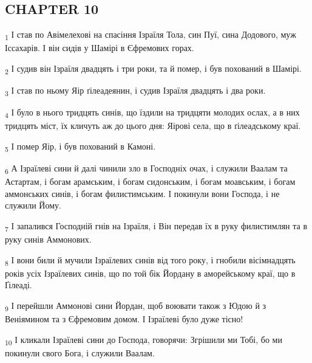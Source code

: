 \subsection{CHAPTER 10}
\begin{tcolorbox}
\textsubscript{1} І став по Авімелехові на спасіння Ізраїля Тола, син Пуї, сина Додового, муж Іссахарів. І він сидів у Шамірі в Єфремових горах.
\end{tcolorbox}
\begin{tcolorbox}
\textsubscript{2} І судив він Ізраїля двадцять і три роки, та й помер, і був похований в Шамірі.
\end{tcolorbox}
\begin{tcolorbox}
\textsubscript{3} І став по ньому Яір ґілеадеянин, і судив Ізраїля двадцять і два роки.
\end{tcolorbox}
\begin{tcolorbox}
\textsubscript{4} І було в нього тридцять синів, що їздили на тридцяти молодих ослах, а в них тридцять міст, їх кличуть аж до цього дня: Яірові села, що в ґілеадському краї.
\end{tcolorbox}
\begin{tcolorbox}
\textsubscript{5} І помер Яір, і був похований в Камоні.
\end{tcolorbox}
\begin{tcolorbox}
\textsubscript{6} А Ізраїлеві сини й далі чинили зло в Господніх очах, і служили Ваалам та Астартам, і богам арамським, і богам сидонським, і богам моавським, і богам аммонських синів, і богам филистимським. І покинули вони Господа, і не служили Йому.
\end{tcolorbox}
\begin{tcolorbox}
\textsubscript{7} І запалився Господній гнів на Ізраїля, і Він передав їх в руку филистимлян та в руку синів Аммонових.
\end{tcolorbox}
\begin{tcolorbox}
\textsubscript{8} І вони били й мучили Ізраїлевих синів від того року, і гнобили вісімнадцять років усіх Ізраїлевих синів, що по той бік Йордану в аморейському краї, що в Ґілеаді.
\end{tcolorbox}
\begin{tcolorbox}
\textsubscript{9} І перейшли Аммонові сини Йордан, щоб воювати також з Юдою й з Веніямином та з Єфремовим домом. І Ізраїлеві було дуже тісно!
\end{tcolorbox}
\begin{tcolorbox}
\textsubscript{10} І кликали Ізраїлеві сини до Господа, говорячи: Згрішили ми Тобі, бо ми покинули свого Бога, і служили Ваалам.
\end{tcolorbox}

